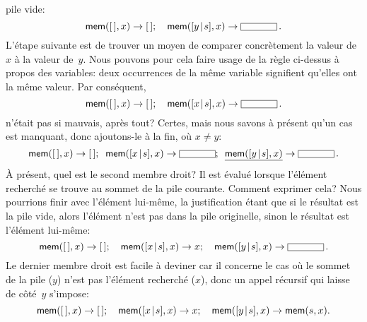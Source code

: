 pile vide:
\begin{equation*}
\fun{mem}(\el,x) \rightarrow \el;\quad
\fun{mem}(\cons{y}{s},x) \rightarrow \fbcode{CCCCC}\,.
\end{equation*}
L'étape suivante est de trouver un moyen de comparer concrètement la
valeur de~\(x\) à la valeur de~\(y\). Nous pouvons pour cela faire
usage de la règle ci-dessus à propos des variables: deux occurrences
de la même variable signifient qu'elles ont la même valeur. Par
conséquent,
\begin{equation*}
\fun{mem}(\el,x) \rightarrow \el;\quad
\fun{mem}(\cons{x}{s},x) \rightarrow \fbcode{CCCCC}\,.
\end{equation*}
n'était pas si mauvais, après tout?  Certes, mais nous savons à
présent qu'un cas est manquant, donc ajoutons-le à la fin, où \(x \neq
y\):
\begin{equation*}
\fun{mem}(\el,x) \rightarrow \el;\;\;
\fun{mem}(\cons{x}{s},x) \rightarrow \fbcode{CCCCC};\;\:
\underline{\fun{mem}(\cons{y}{s},x)} \rightarrow \fbcode{CCCCC}\,.
\end{equation*}
À présent, quel est le second membre droit? Il est évalué lorsque
l'élément recherché se trouve au sommet de la pile courante. Comment
exprimer cela? Nous pourrions finir avec l'élément lui-même, la
justification étant que si le résultat est la pile vide, alors
l'élément n'est pas dans la pile originelle, sinon le résultat est
l'élément lui-même:
\begin{equation*}
\fun{mem}(\el,x) \rightarrow \el;\quad
\fun{mem}(\cons{x}{s},x) \rightarrow x;\quad
\fun{mem}(\cons{y}{s},x) \rightarrow \fbcode{CCCCC}\,.
\end{equation*}
Le dernier membre droit est facile à deviner car il concerne le cas où
le sommet de la pile (\(y\)) n'est pas l'élément recherché (\(x\)),
donc un appel récursif qui laisse de côté~\(y\) s'impose:
\begin{equation*}
\textsf{mem}([\,],x) \rightarrow [\,];\quad
\textsf{mem}([{x}\!\mid\!{s}],x) \rightarrow x;\quad
\textsf{mem}([{y}\!\mid\!{s}],x) \rightarrow \textsf{mem}(s,x).
\end{equation*}

